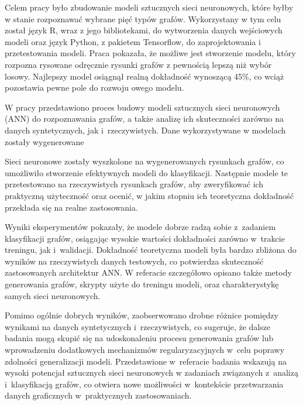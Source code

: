 Celem pracy było zbudowanie modeli sztucznych sieci neuronowych,
które byłby w stanie rozpoznawać wybrane pięć typów grafów.
Wykorzystany w tym celu został język R, wraz z jego bibliotekami, do wytworzenia danych wejściowych modeli
oraz język Python, z pakietem Tensorflow, do zaprojektowania i przetestowania modeli.
Praca pokazała, że możliwe jest stworzenie modelu, który rozpozna rysowane odręcznie rysunki grafów
z pewnością lepszą niż wybór losowy.
Najlepszy model osiągnął realną dokładność wynoszącą 45\%, co wciąż pozostawia pewne pole do rozwoju owego modelu.


W pracy przedstawiono proces budowy modeli sztucznych sieci neuronowych (ANN) do rozpoznawania grafów,
a także analizę ich skuteczności zarówno na danych syntetycznych, jak i~rzeczywistych.
Dane wykorzystywane w modelach zostały wygenerowane

Sieci neuronowe zostały wyszkolone na wygenerowanych rysunkach grafów,
co umożliwiło stworzenie efektywnych modeli do klasyfikacji.
Następnie modele te przetestowano na rzeczywistych rysunkach grafów,
aby zweryfikować ich praktyczną użyteczność oraz ocenić,
w jakim stopniu ich teoretyczna dokładność przekłada się na realne zastosowania.

Wyniki eksperymentów pokazały, że modele dobrze radzą sobie z~zadaniem klasyfikacji grafów,
osiągając wysokie wartości dokładności zarówno w~trakcie treningu, jak i~walidacji.
Dokładność teoretyczna modeli była bardzo zbliżona do wyników na rzeczywistych danych testowych,
co potwierdza skuteczność zastosowanych architektur ANN.
W referacie szczegółowo opisano także metody generowania grafów,
skrypty użyte do treningu modeli, oraz charakterystykę samych sieci neuronowych.

Pomimo ogólnie dobrych wyników,
zaobserwowano drobne różnice pomiędzy wynikami na danych syntetycznych i~rzeczywistych,
co sugeruje, że dalsze badania mogą skupić się na udoskonaleniu procesu generowania grafów
lub wprowadzeniu dodatkowych mechanizmów regularyzacyjnych w~celu poprawy zdolności generalizacji modeli.
Przedstawione w~referacie badania wskazują na wysoki potencjał sztucznych sieci neuronowych
w zadaniach związanych z~analizą i~klasyfikacją grafów,
co otwiera nowe możliwości w~kontekście przetwarzania danych graficznych w~praktycznych zastosowaniach.

